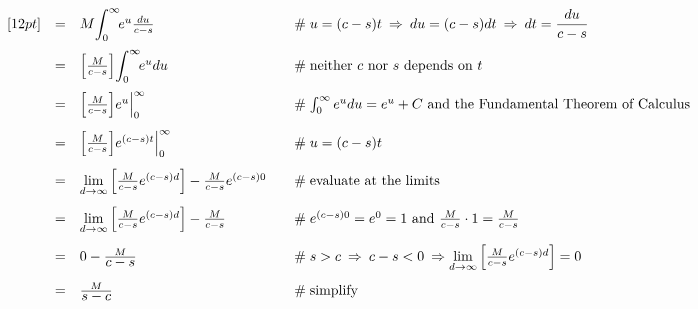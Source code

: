 \documentclass{article}
\theoremstyle{definition}
\begin{document}
\begin{equation*}
\begin{array}{lllll}
[12pt]                                                                                 %
&=&  M \mathlarger{\int}_0^\infty \! e^u \frac{du}{c-s}       &\quad  \mathrel{\#} u = (c-s)t  \: \Rightarrow \: du = (c-s) dt \: \Rightarrow \: dt = \dfrac{du}{c-s}                                                         \\     
[12pt]                                                                                %
&=& \Big [ \frac{M}{c-s} \Big ] \mathlarger{\int}_0^\infty \! e^u du                                    &\quad  \mathrel{\#} \text{neither $c$ nor $s$ depends on $t$}                                                              \\     
[12pt]                                                                                %
&=& \Big [ \frac{M}{c-s} \Big ] e^u \Big |_0^\infty              &\quad  \mathrel{\#} \int_0^\infty e^u du = e^u +C \text{ and the Fundamental Theorem of Calculus}                                                  \\     
[12pt]                                                                                %
&=& \Big [ \frac{M}{c-s} \Big ]  e^{(c-s)t} \Big |_0^\infty     &\quad  \mathrel{\#} u = (c-s)t                                                                                                                                                                \\
[12pt]                                                                                %
&=& \lim\limits_{d \to \infty}\Big [\frac{M}{c-s} e^{(c-s)d} \Big ] - \frac{M}{c - s}e^{(c-s)0}  &\quad \mathrel{\#} \text{evaluate at the limits}                                                                                     \\
[12pt]                                                                                %
&=& \lim\limits_{d \to \infty}\Big [\frac{M}{c-s} e^{(c-s)d} \Big ] - \frac{M}{c - s}                 &\quad  \mathrel{\#} e^{(c-s)0} = e^0 = 1 \text{ and } \frac{M}{c-s} \cdot 1 = \frac{M}{c-s}                     \\
[12pt]                                                                                %
&=& 0 - \frac{M} {\mathlarger{c-s}}                                   &\quad  \mathrel{\#} s > c \: \Rightarrow \: c -s < 0 \: \Rightarrow  \lim\limits_{d \to \infty}\Big [\frac{M}{c-s} e^{(c-s)d} \Big ] = 0          \\    
[12pt]                                                                                %
&=& \frac{M}{\mathlarger{s-c}}                                         &\quad  \mathrel{\#} \text{simplify} 
\end{array}
\end{equation*}
\end{document}
